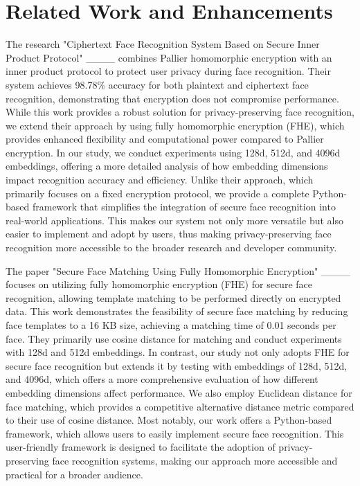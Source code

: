 \section{Related Work and Enhancements}
The research "Ciphertext Face Recognition System Based on Secure Inner Product Protocol" ____ combines Pallier homomorphic encryption with an inner product protocol to protect user privacy during face recognition. Their system achieves 98.78\% accuracy for both plaintext and ciphertext face recognition, demonstrating that encryption does not compromise performance. While this work provides a robust solution for privacy-preserving face recognition, we extend their approach by using fully homomorphic encryption (FHE), which provides enhanced flexibility and computational power compared to Pallier encryption. In our study, we conduct experiments using 128d, 512d, and 4096d embeddings, offering a more detailed analysis of how embedding dimensions impact recognition accuracy and efficiency. Unlike their approach, which primarily focuses on a fixed encryption protocol, we provide a complete Python-based framework that simplifies the integration of secure face recognition into real-world applications. This makes our system not only more versatile but also easier to implement and adopt by users, thus making privacy-preserving face recognition more accessible to the broader research and developer community.

The paper "Secure Face Matching Using Fully Homomorphic Encryption" ____ focuses on utilizing fully homomorphic encryption (FHE) for secure face recognition, allowing template matching to be performed directly on encrypted data. This work demonstrates the feasibility of secure face matching by reducing face templates to a 16 KB size, achieving a matching time of 0.01 seconds per face. They primarily use cosine distance for matching and conduct experiments with 128d and 512d embeddings. In contrast, our study not only adopts FHE for secure face recognition but extends it by testing with embeddings of 128d, 512d, and 4096d, which offers a more comprehensive evaluation of how different embedding dimensions affect performance. We also employ Euclidean distance for face matching, which provides a competitive alternative distance metric compared to their use of cosine distance. Most notably, our work offers a Python-based framework, which allows users to easily implement secure face recognition. This user-friendly framework is designed to facilitate the adoption of privacy-preserving face recognition systems, making our approach more accessible and practical for a broader audience.